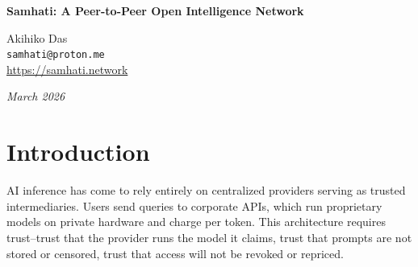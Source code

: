 \documentclass[11pt,a4paper]{article}
\begin{document}
\begin{center}
{\LARGE \textbf{Samhati: A Peer-to-Peer Open Intelligence Network}}

\vspace{1em}

Akihiko Das\\
\texttt{samhati@proton.me}\\
\url{https://samhati.network}

\vspace{0.5em}
\textit{March 2026}
\end{center}

\vspace{1em}

\begin{abstract}
A purely peer-to-peer intelligence network would allow any device to serve AI inference without relying on centralized providers. AI today depends on corporate infrastructure--users pay per query, have no choice of model, and cannot verify what served their request. We propose a system where every participant simultaneously consumes and contributes intelligence. Queries fan out to multiple independent nodes running small language models. Nodes peer-rank each other's answers, and BradleyTerry maximum likelihood estimation selects the statistically best response. A cryptographic Proof of Inference built from output logprobs prevents replay and binds proofs to node identities. A dual-track EMA reputation system tracks both answer quality and ranking honesty, with Bayesian uncertainty and adaptive validation rates. Results settle on Solana. The system requires no staking, no special hardware, and no permission to join.
\end{abstract}

\vspace{1em}

\section{Introduction}

AI inference has come to rely entirely on centralized providers serving as trusted intermediaries. Users send queries to corporate APIs, which run proprietary models on private hardware and charge per token. This architecture requires trust--trust that the provider runs the model it claims, trust that prompts are not stored or censored, trust that access will not be revoked or repriced.
\end{document}
